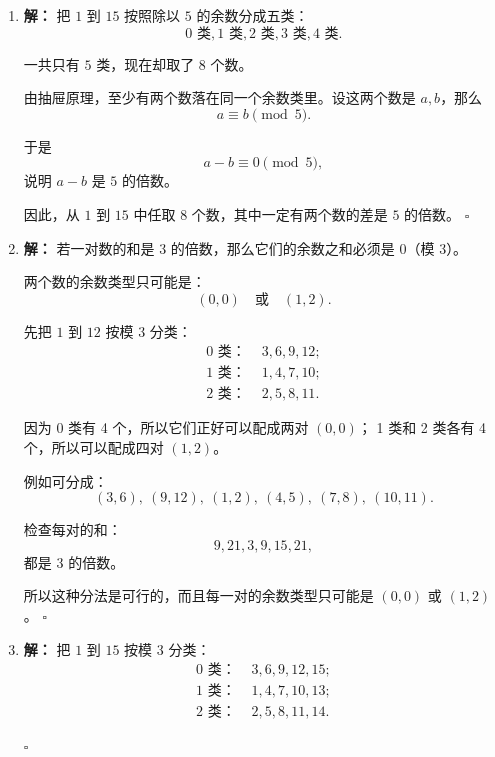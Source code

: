 \documentclass[11pt,a4paper,fontset=fandol]{ctexart}
\theoremstyle{formalexample}
\newenvironment{solution}{\par\noindent\textbf{解：}}{\hfill$\square$\par}
\begin{document}
\begin{enumerate}
\begin{solution}
  \textbf{3. 类型 $(2,2,2,0)$：}
  同理可得
  \[
  1\cdot \binom31=3.
  \]

  \textbf{4. 类型 $(1,1,2,2)$：}
  从 1 类选 2 个，从 2 类选 2 个：
  \[
  \binom32\cdot \binom32=3\times 3=9.
  \]

  所以总数为
  \[
  27+3+3+9=42.
  \]
  \end{solution}

  \item \begin{solution}
  把 $1$ 到 $15$ 按照除以 $5$ 的余数分成五类：
  \[
  0\text{ 类},1\text{ 类},2\text{ 类},3\text{ 类},4\text{ 类}.
  \]

  一共只有 $5$ 类，现在却取了 $8$ 个数。

  由抽屉原理，至少有两个数落在同一个余数类里。设这两个数是 $a,b$，那么
  \[
  a\equiv b\pmod 5.
  \]

  于是
  \[
  a-b\equiv 0\pmod 5,
  \]
  说明 $a-b$ 是 $5$ 的倍数。

  因此，从 $1$ 到 $15$ 中任取 $8$ 个数，其中一定有两个数的差是 $5$ 的倍数。
  \end{solution}

  \item \begin{solution}
  若一对数的和是 $3$ 的倍数，那么它们的余数之和必须是 $0$（模 $3$）。

  两个数的余数类型只可能是：
  \[
  (0,0)\quad \text{或} \quad (1,2).
  \]

  先把 $1$ 到 $12$ 按模 $3$ 分类：
  \[
  \begin{aligned}
  0\text{ 类： }&3,6,9,12;\\
  1\text{ 类： }&1,4,7,10;\\
  2\text{ 类： }&2,5,8,11.
  \end{aligned}
  \]

  因为 0 类有 4 个，所以它们正好可以配成两对 $(0,0)$；
  1 类和 2 类各有 4 个，所以可以配成四对 $(1,2)$。

  例如可分成：
  \[
  (3,6),\ (9,12),\ (1,2),\ (4,5),\ (7,8),\ (10,11).
  \]

  检查每对的和：
  \[
  9,21,3,9,15,21,
  \]
  都是 $3$ 的倍数。

  所以这种分法是可行的，而且每一对的余数类型只可能是 $(0,0)$ 或 $(1,2)$。
  \end{solution}

  \item \begin{solution}
  把 $1$ 到 $15$ 按模 $3$ 分类：
  \[
  \begin{aligned}
  0\text{ 类： }&3,6,9,12,15;\\
  1\text{ 类： }&1,4,7,10,13;\\
  2\text{ 类： }&2,5,8,11,14.
  \end{aligned}
  \]


\end{solution}
\end{enumerate}
\end{document}
